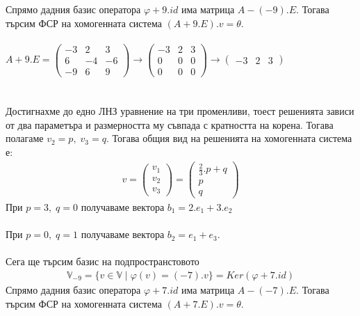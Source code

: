\documentclass[a4paper, 12pt]{article}
\begin{document}
    Спрямо дадния базис оператора $\varphi + 9.id$ има матрица $A - (-9).E$.
    Тогава търсим ФСР на хомогенната система $(A + 9.E).v = \theta$.\\\\
    $A + 9.E = \begin{pmatrix}
        -3 & 2 & 3\\
        6 & -4 & -6\\
        -9 & 6 & 9
    \end{pmatrix} \to \begin{pmatrix}
        -3 & 2 & 3\\
        0 & 0 & 0\\
        0 & 0 & 0
    \end{pmatrix} \to \begin{pmatrix}
        -3 & 2 & 3
    \end{pmatrix}$\\\\\\
    Достигнахме до едно ЛНЗ уравнение на три променливи,
    тоест решенията зависи от два параметъра и размерността
    му съвпада с кратността на корена. Тогава полагаме
    $v_2 = p, \; v_3 = q$. Тогава общия вид на решенията
    на хомогенната система е:
    \begin{align*}
        v = \begin{pmatrix}
            v_1 \\
            v_2 \\
            v_3
        \end{pmatrix} = \begin{pmatrix}
            \frac{2}{3}.p + q \\
            p \\
            q
        \end{pmatrix}
    \end{align*}
    При $p = 3, \; q = 0$ получаваме вектора $b_1 = 2.e_1 + 3.e_2$ \\\\
    При $p = 0, \; q = 1$ получаваме вектора $b_2 = e_1 + e_3$. \\\\
    Сега ще търсим базис на подпространстовото
    \begin{align*}
        \mathbb{V}_{-9} = \{v \in \mathbb{V} \; | \; \varphi(v) = (-7).v\} = Ker(\varphi + 7.id)
    \end{align*}
    Спрямо дадния базис оператора $\varphi + 7.id$ има матрица $A - (-7 ).E$.
    Тогава търсим ФСР на хомогенната система $(A + 7.E).v = \theta$.\\\\
\end{document}

